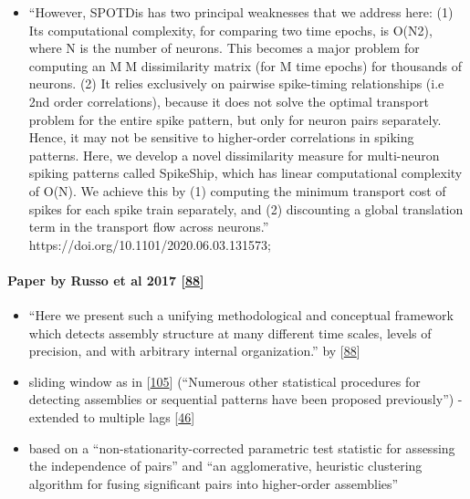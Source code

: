 \begin{itemize}
\tightlist
\item
  ``However, SPOTDis has two principal weaknesses that we address here: (1) Its computational complexity, for comparing two time epochs, is O(N2), where N is the number of neurons. This becomes a major problem for computing an MM dissimilarity matrix (for M time epochs) for thousands of neurons. (2) It relies exclusively on pairwise spike-timing relationships (i.e 2nd order correlations), because it does not solve the optimal transport problem for the entire spike pattern, but only for neuron pairs separately. Hence, it may not be sensitive to higher-order correlations in spiking
  patterns.
  Here, we develop a novel dissimilarity measure for multi-neuron spiking patterns called SpikeShip, which has linear computational complexity of O(N). We achieve this by (1) computing the minimum transport cost of spikes for each spike train separately, and (2) discounting a global translation term in the transport flow across neurons.''
  https://doi.org/10.1101/2020.06.03.131573;
\end{itemize}

\hypertarget{paper-by-russo-et-al-2017-russo2017}{%
\paragraph{\texorpdfstring{Paper by Russo et al 2017 {[}\protect\hyperlink{ref-RrgzWOSk}{88}{]}}{Paper by Russo et al 2017 {[}88{]}}}\label{paper-by-russo-et-al-2017-russo2017}}

\begin{itemize}
\tightlist
\item
  ``Here we present such a unifying methodological and conceptual framework which detects assembly structure at many different time scales, levels of precision, and with arbitrary internal organization.'' by {[}\protect\hyperlink{ref-RrgzWOSk}{88}{]}
\item
  sliding window as in {[}\protect\hyperlink{ref-1XpTamcl}{105}{]} (``Numerous other statistical procedures for detecting assemblies or sequential patterns have been proposed previously'') - extended to multiple lags {[}\protect\hyperlink{ref-bc9czTxi}{46}{]}
\item
  based on a ``non-stationarity-corrected parametric test statistic for assessing the independence of pairs'' and ``an agglomerative, heuristic clustering algorithm for fusing significant pairs into higher-order assemblies''
\end{itemize}

